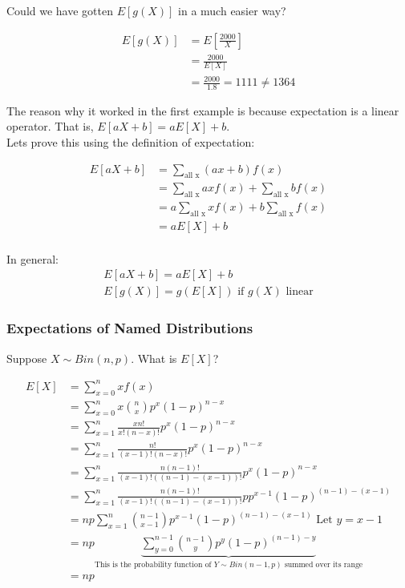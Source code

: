 \documentclass[12pt, letterpaper]{article}
\begin{document}
Could we have gotten \(E[g\left(X\right)]\) in a much easier way?

\begin{align*}
E[g\left(X\right)] &= E\left[\frac{2000}{X}\right] \\
&= \frac{2000}{E[X]}\\
&= \frac{2000}{1.8} = 1111 \neq 1364
\end{align*}

The reason why it worked in the first example is because expectation is a linear operator. That is, \(E[aX + b] = aE[X] + b\).\\

Lets prove this using the definition of expectation:

\begin{align*}
E[aX + b] &= \sum_{\text{all x}} (ax + b)f\left(x\right)\\
&= \sum_{\text{all x}} axf\left(x\right) + \sum_{\text{all x}} bf\left(x\right)\\
&= a\sum_{\text{all x}} xf\left(x\right) + b\sum_{\text{all x}} f\left(x\right)\\
&= aE[X] + b
\end{align*}\\

In general:
\begin{align}
E[aX + b] = aE[X] + b\\
E[g\left(X\right)] = g\left(E[X]\right) \text{ if } g\left(X\right) \text{ linear}
\end{align}

\newpage

\subsubsection{Expectations of Named Distributions}
Suppose \(X \sim Bin(n, p)\). What is \(E[X]\)?

\begin{align*}
E[X] &= \sum_{x = 0}^n x f\left(x\right)\\
&= \sum_{x = 0}^n x {{n} \choose {x}} p^x (1 - p)^{n - x}\\
&= \sum_{x = 1}^n \frac{xn!}{x!(n - x)!} p^x (1 - p)^{n - x}\\
&= \sum_{x = 1}^n \frac{n!}{(x - 1)!(n - x)!} p^x (1 - p)^{n - x}\\
&= \sum_{x = 1}^n \frac{n(n - 1)!}{(x - 1)!((n - 1) - (x - 1))!} p^x (1 - p)^{n - x}\\
&= \sum_{x = 1}^n \frac{n(n - 1)!}{(x - 1)!((n - 1) - (x - 1))!} pp^{x - 1} (1 - p)^{(n - 1) - (x - 1)}\\
&= np \sum_{x = 1}^n {{n - 1} \choose {x - 1}} p^{x - 1} (1 - p)^{(n - 1) - (x - 1)} \text{ Let } y = x - 1\\
&= np \underbrace{\sum_{y = 0}^{n - 1} {{n - 1} \choose {y}} p^{y} (1 - p)^{(n - 1) - y}}_\text{This is the probability function of $Y \sim Bin(n - 1, p)$ summed over its range}\\
&= np
\end{align*}
\end{document}
